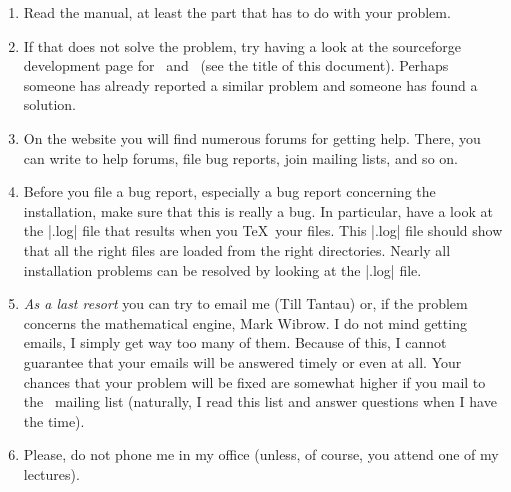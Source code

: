 \begin{enumerate}
\item
  Read the manual, at least the part that has to do with your problem.
\item
  If that does not solve the problem, try having a look at the
  sourceforge development page for \pgfname\ and \tikzname\ (see the
  title of this document). Perhaps someone has already reported a
  similar problem and someone has found a solution.
\item
  On the website you will find numerous forums for getting
  help. There, you can write to help forums, file bug reports, join
  mailing lists, and so on.
\item
  Before you file a bug report, especially a bug report concerning the
  installation, make sure that this is really a bug. In particular,
  have a look at the |.log| file that results when you \TeX\ your
  files. This |.log| file should show that all the right files are
  loaded from the right directories. Nearly all installation problems
  can be resolved by looking at the |.log| file.
\item
  \emph{As a last resort} you can try to email me (Till Tantau) or, if
  the problem concerns the mathematical engine, Mark Wibrow. I do
  not mind getting emails, I simply get way too many of them. Because
  of this, I cannot guarantee that your emails will be answered timely
  or even at all. Your chances that your problem will be fixed are
  somewhat higher if you mail to the \pgfname\ mailing list
  (naturally, I read this list and answer questions when I have the
  time).
\item
  Please, do not phone me in my office (unless, of course, you attend
  one of my lectures).
\end{enumerate}

